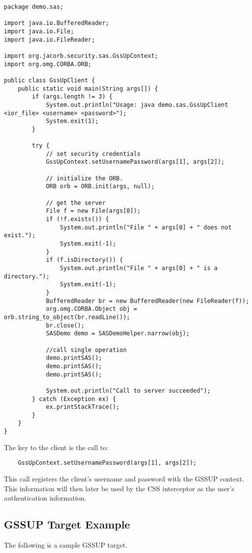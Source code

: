 \begin{scriptsize}
\begin{verbatim}
package demo.sas;

import java.io.BufferedReader;
import java.io.File;
import java.io.FileReader;

import org.jacorb.security.sas.GssUpContext;
import org.omg.CORBA.ORB;

public class GssUpClient {
	public static void main(String args[]) {
		if (args.length != 3) {
			System.out.println("Usage: java demo.sas.GssUpClient <ior_file> <username> <password>");
			System.exit(1);
		}

		try {
			// set security credentials
			GssUpContext.setUsernamePassword(args[1], args[2]);

			// initialize the ORB.
			ORB orb = ORB.init(args, null);

			// get the server
			File f = new File(args[0]);
			if (!f.exists()) {
				System.out.println("File " + args[0] + " does not exist.");
				System.exit(-1);
			}
			if (f.isDirectory()) {
				System.out.println("File " + args[0] + " is a directory.");
				System.exit(-1);
			}
			BufferedReader br = new BufferedReader(new FileReader(f));
			org.omg.CORBA.Object obj = orb.string_to_object(br.readLine());
			br.close();
			SASDemo demo = SASDemoHelper.narrow(obj);

			//call single operation
			demo.printSAS();
			demo.printSAS();
			demo.printSAS();

			System.out.println("Call to server succeeded");
		} catch (Exception ex) {
			ex.printStackTrace();
		}
	}
}
\end{verbatim}
\end{scriptsize}

The key to the client is the call to:
\begin{scriptsize}
\begin{verbatim}
    GssUpContext.setUsernamePassword(args[1], args[2]);
\end{verbatim}
\end{scriptsize}
This call registers the client's username and password with the GSSUP context.
This information will then later be used by the CSS interceptor as the user's
authentication information.

\subsection{GSSUP Target Example}

The following is a sample GSSUP target.

